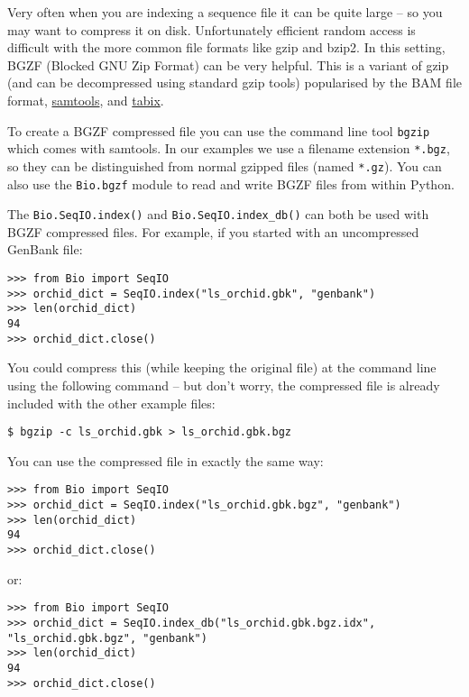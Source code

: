 Very often when you are indexing a sequence file it can be quite large -- so
you may want to compress it on disk. Unfortunately efficient random access
is difficult with the more common file formats like gzip and bzip2. In this
setting, BGZF (Blocked GNU Zip Format) can be very helpful. This is a variant
of gzip (and can be decompressed using standard gzip tools) popularised by
the BAM file format, \href{https://www.htslib.org/}{samtools}, and
\href{https://www.htslib.org/doc/tabix.html}{tabix}.

To create a BGZF compressed file you can use the command line tool \verb|bgzip|
which comes with samtools. In our examples we use a filename extension
\verb|*.bgz|, so they can be distinguished from normal gzipped files (named
\verb|*.gz|). You can also use the \verb|Bio.bgzf| module to read and write
BGZF files from within Python.

The \verb|Bio.SeqIO.index()| and \verb|Bio.SeqIO.index_db()| can both be
used with BGZF compressed files. For example, if you started with an
uncompressed GenBank file:

\begin{verbatim}
>>> from Bio import SeqIO
>>> orchid_dict = SeqIO.index("ls_orchid.gbk", "genbank")
>>> len(orchid_dict)
94
>>> orchid_dict.close()
\end{verbatim}

You could compress this (while keeping the original file) at the command
line using the following command -- but don't worry, the compressed file
is already included with the other example files:

\begin{verbatim}
$ bgzip -c ls_orchid.gbk > ls_orchid.gbk.bgz
\end{verbatim}

You can use the compressed file in exactly the same way:

\begin{verbatim}
>>> from Bio import SeqIO
>>> orchid_dict = SeqIO.index("ls_orchid.gbk.bgz", "genbank")
>>> len(orchid_dict)
94
>>> orchid_dict.close()
\end{verbatim}

\noindent
or:

\begin{verbatim}
>>> from Bio import SeqIO
>>> orchid_dict = SeqIO.index_db("ls_orchid.gbk.bgz.idx", "ls_orchid.gbk.bgz", "genbank")
>>> len(orchid_dict)
94
>>> orchid_dict.close()
\end{verbatim}

